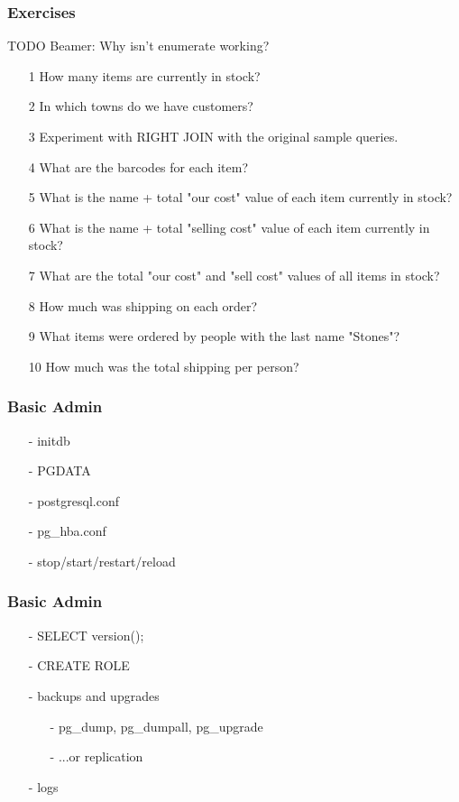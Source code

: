 \documentclass[20pt]{beamer}
\begin{document}

\frame
{
    \frametitle{Exercises}
    TODO Beamer:  Why isn't enumerate working?
    \begin{enumerate}
    \small
    \item[1] How many items are currently in stock?
    \item[2] In which towns do we have customers?
    \item[3] Experiment with RIGHT JOIN with the original sample queries.
    \item[4] What are the barcodes for each item?
    \item[5] What is the name + total "our cost" value of each item currently in stock?
    \item[6] What is the name + total "selling cost" value of each item currently in stock?
    \item[7] What are the total "our cost" and "sell cost" values of all items in stock?
    \item[8] How much was shipping on each order?
    \item[9] What items were ordered by people with the last name "Stones"?
    \item[10] How much was the total shipping per person?
    \end{enumerate}
}

\frame
{
    \frametitle{Basic Admin}
    \begin{itemize}
    \item[-] initdb
    \item[-] PGDATA
    \item[-] postgresql.conf
    \item[-] pg\_hba.conf
    \item[-] stop/start/restart/reload
    \end{itemize}
}

\frame
{
    \frametitle{Basic Admin}
    \begin{itemize}
    \item[-] SELECT version();
    \item[-] CREATE ROLE
    \item[-] backups and upgrades
        \begin{itemize}
        \item[-] pg\_dump, pg\_dumpall, pg\_upgrade
        \item[-] ...or replication
        \end{itemize}
    \item[-] logs 
    \end{itemize}
}
\end{document}
